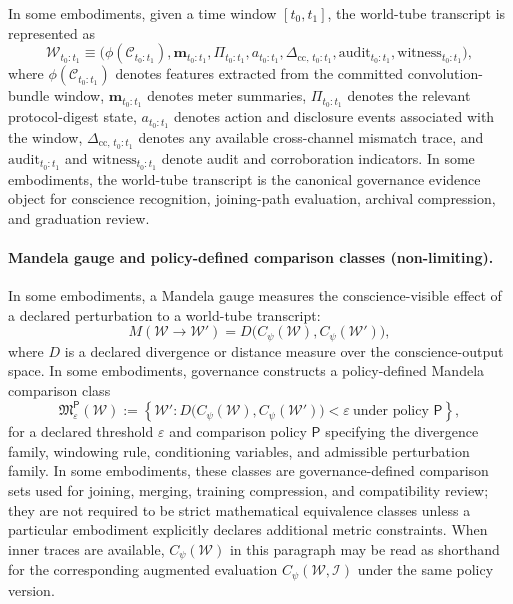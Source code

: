 \documentclass[a4paper,12pt]{article}
\newcommand{\Cset}{\mathcal{C}}
\newcommand{\cba}{convolution-bundle\xspace}
\begin{document}
In some embodiments, given a time window $[t_0,t_1]$, the
world-tube transcript is represented as
\[
  \mathcal{W}_{t_0:t_1}
  \equiv
  \bigl(
    \phi(\Cset_{t_0:t_1}),
    \mathbf{m}_{t_0:t_1},
    \Pi_{t_0:t_1},
    a_{t_0:t_1},
    \Delta_{\mathrm{cc},\,t_0:t_1},
    \mathrm{audit}_{t_0:t_1},
    \mathrm{witness}_{t_0:t_1}
  \bigr),
\]
where $\phi(\Cset_{t_0:t_1})$ denotes features extracted from the
committed \cba window, $\mathbf{m}_{t_0:t_1}$ denotes
meter summaries, $\Pi_{t_0:t_1}$ denotes the relevant protocol-digest
state, $a_{t_0:t_1}$ denotes action and disclosure events associated
with the window, $\Delta_{\mathrm{cc},\,t_0:t_1}$ denotes any available
cross-channel mismatch trace, and $\mathrm{audit}_{t_0:t_1}$ and
$\mathrm{witness}_{t_0:t_1}$ denote audit and corroboration indicators.
In some embodiments, the world-tube transcript is the canonical
governance evidence object for conscience recognition, joining-path
evaluation, archival compression, and graduation review.

\paragraph{Mandela gauge and policy-defined comparison classes (non-limiting).}
\label{sec:mandela-gauge-formal}
In some embodiments, a Mandela gauge measures the conscience-visible
effect of a declared perturbation to a world-tube transcript:
\[
  M(\mathcal{W}\!\to\!\mathcal{W}')
  =
  D\!\bigl(
    C_\psi(\mathcal{W}),
    C_\psi(\mathcal{W}')
  \bigr),
\]
where $D$ is a declared divergence or distance measure over the
conscience-output space. In some embodiments, governance constructs a
policy-defined Mandela comparison class
\[
  \mathfrak{M}^{\mathsf{P}}_{\varepsilon}(\mathcal{W})
  :=
  \left\{
    \mathcal{W}' :
    D\!\bigl(C_\psi(\mathcal{W}), C_\psi(\mathcal{W}')\bigr)
    < \varepsilon
    \ \text{under policy }\mathsf{P}
  \right\},
\]
for a declared threshold $\varepsilon$ and comparison policy
$\mathsf{P}$ specifying the divergence family, windowing rule,
conditioning variables, and admissible perturbation family. In some
embodiments, these classes are governance-defined comparison sets used
for joining, merging, training compression, and compatibility review;
they are not required to be strict mathematical equivalence classes
unless a particular embodiment explicitly declares additional metric
constraints. When inner traces are available, $C_\psi(\mathcal{W})$
in this paragraph may be read as shorthand for the corresponding
augmented evaluation
$C_\psi(\mathcal{W},\mathcal{I})$ under the same policy version.
\end{document}
